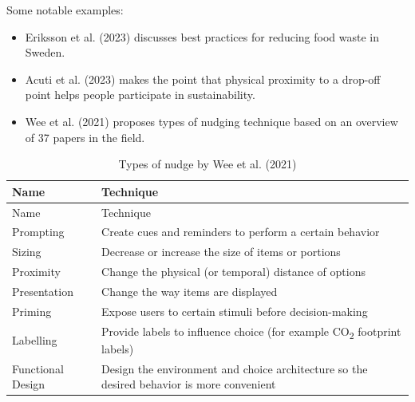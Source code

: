\documentclass[
  letterpaper,
  DIV=11,
  numbers=noendperiod]{scrartcl}
\providecommand{\tightlist}{%
  \setlength{\itemsep}{0pt}\setlength{\parskip}{0pt}}\usepackage{longtable,booktabs,array}
\begin{document}
Some notable examples:

\begin{itemize}
\tightlist
\item
  Eriksson et al. (2023) discusses best practices for reducing food
  waste in Sweden.
\item
  Acuti et al. (2023) makes the point that physical proximity to a
  drop-off point helps people participate in sustainability.
\item
  Wee et al. (2021) proposes types of nudging technique based on an
  overview of 37 papers in the field.
\end{itemize}

\begin{longtable}[]{@{}
  >{\raggedright\arraybackslash}p{}
  >{\raggedright\arraybackslash}p{}@{}}
\caption{Types of nudge by Wee et al. (2021)}\tabularnewline
\toprule\noalign{}
\begin{minipage}[b]{\linewidth}\raggedright
Name
\end{minipage} & \begin{minipage}[b]{\linewidth}\raggedright
Technique
\end{minipage} \\
\midrule\noalign{}
\endfirsthead
\toprule\noalign{}
\begin{minipage}[b]{\linewidth}\raggedright
Name
\end{minipage} & \begin{minipage}[b]{\linewidth}\raggedright
Technique
\end{minipage} \\
\midrule\noalign{}
\endhead
\bottomrule\noalign{}
\endlastfoot
Prompting & Create cues and reminders to perform a certain behavior \\
Sizing & Decrease or increase the size of items or portions \\
Proximity & Change the physical (or temporal) distance of options \\
Presentation & Change the way items are displayed \\
Priming & Expose users to certain stimuli before decision-making \\
Labelling & Provide labels to influence choice (for example
CO\textsubscript{2} footprint labels) \\
Functional Design & Design the environment and choice architecture so
the desired behavior is more convenient \\
\end{longtable}
\end{document}
